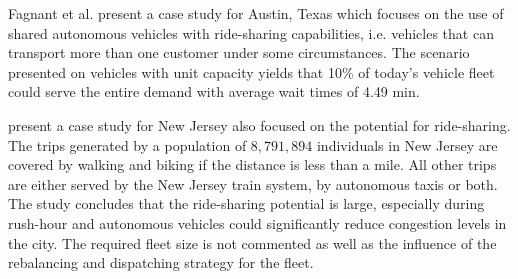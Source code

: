 
Fagnant et al. \cite{fagnant2015dynamic} present a case study for Austin, Texas
which focuses on the use of shared autonomous vehicles with ride-sharing capabilities,
i.e. vehicles that can transport more than one customer under some circumstances.
The scenario presented on vehicles with unit capacity yields that 10\% of today's
vehicle fleet could serve the entire demand with average wait times of 4.49 min.

\cite{zachariah2014uncongested} present a case study for New Jersey also focused
on the potential for ride-sharing. The trips generated by a population of $8,791,894$
individuals in New Jersey are covered by walking and biking if the distance is
less than a mile. All other trips are either served by the New Jersey train system,
by autonomous taxis or both. The study concludes that the ride-sharing potential
is large, especially during rush-hour and autonomous vehicles could significantly
reduce congestion levels in the city. The required fleet size is not commented
as well as the influence of the rebalancing and dispatching strategy for the fleet.

